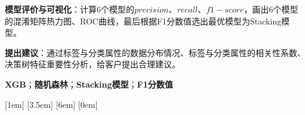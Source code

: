 \textbf{模型评价与可视化}：计算6个模型的$precision$、$recall$、$f1-score$，画出6个模型的混淆矩阵热力图、ROC曲线，最后根据F1分数值选出最优模型为Stacking模型。


\textbf{提出建议}：通过标签与分类属性的数据分布情况、标签与分类属性的相关性系数、决策树特征重要性分析，给客户提出合理建议。



\par


\par

\noindent {}\textbf{XGB}；\textbf{随机森林}；\textbf{Stacking模型}；\textbf{F1分数值}

\clearpage



[1em]
{\heiti{}}%
{\contentslabel{1em}}%
{}%
{\titlerule*[0.32pc]{$\cdot$}\contentspage}
[3.5em]
{\songti{}}%
{\contentslabel{1.7em}}%
{}%
{\titlerule*[0.32pc]{$\cdot$}\contentspage}
[6em]
{\songti{}}%
{\contentslabel{2.5em}}%
{}%
{\titlerule*[0.32pc]{$\cdot$}\contentspage}
[0em]
{\heiti{}}%
{\contentslabel{1em}}%
{}%
{\titlerule*[0.32pc]{$\cdot$}\contentspage}
\renewcommand{\cftsecleader}{\cftdotfill{\cftdotsep}}
\newcommand\mydot[1]{\scalebox{#1}{.}}
\renewcommand\cftdot{\mydot{0.8}}
\renewcommand\cftdotsep{1}

\renewcommand{\contentsname}{\zihao{3}目\ \ \ \ \ \ \ \ 录}
\renewcommand{\cftsecfont}{\heiti\zihao{-4}} %
\renewcommand{\cftsecfont}{\heiti} %
\renewcommand{\cftsubsecfont}{\songti\zihao{-4}} %
\rhead{}
\tableofcontents